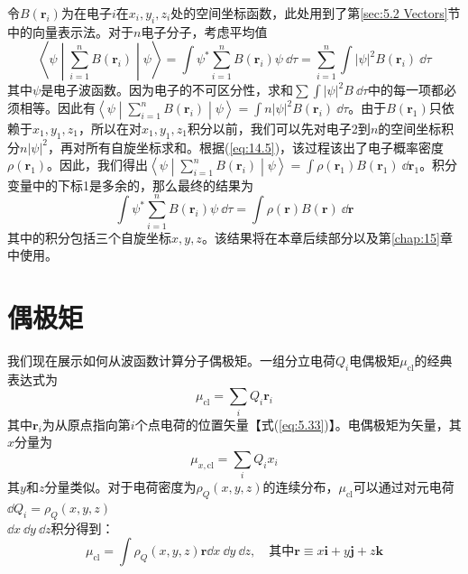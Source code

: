     令$B\left(\mathbf{r}_i\right)$为在电子$i$在$x_i,y_i,z_i$处的空间坐标函数，此处用到了第\ref{sec:5.2 Vectors}节中的向量表示法。对于$n$电子分子，考虑平均值
    \begin{equation*}
        \left\langle \psi \middle| \sum_{i=1}^{n} B\left(\mathbf{r}_i\right) \middle| \psi \right\rangle = \int \psi^* \sum_{i=1}^{n} B\left(\mathbf{r}_i\right) \psi \:\dd \tau = \sum_{i=1}^{n} \int \left|\psi\right|^2 B\left(\mathbf{r}_i\right) \:\dd \tau
    \end{equation*}
    其中$\psi$是电子波函数。因为电子的不可区分性，求和$\sum \int \left|\psi\right|^2B\:\dd \tau$中的每一项都必须相等。因此有$\left\langle \psi \middle| \sum_{i=1}^{n} B\left(\mathbf{r}_i\right) \middle| \psi \right\rangle = \int n \left|\psi\right|^2B\left(\mathbf{r}_i\right)\:\dd \tau$。由于$B\left(\mathbf{r}_1\right)$只依赖于$x_1,y_1,z_1$，所以在对$x_1,y_1,z_1$积分以前，我们可以先对电子2到$n$的空间坐标积分$n\left|\psi\right|^2$，再对所有自旋坐标求和。根据(\ref{eq:14.5})，该过程该出了电子概率密度$\rho\left(\mathbf{r}_1\right)$。因此，我们得出$\left\langle \psi \middle| \sum_{i=1}^{n} B\left(\mathbf{r}_i\right) \middle| \psi \right\rangle = \int \rho\left(\mathbf{r}_1\right) B\left(\mathbf{r}_1\right)\:\dd \mathbf{r}_1$。积分变量中的下标1是多余的，那么最终的结果为
    \begin{equation}
        \int \psi^* \sum_{i=1}^{n} B\left(\mathbf{r}_i\right) \psi \:\dd \tau = \int \rho\left(\mathbf{r}\right) B\left(\mathbf{r}\right)\:\dd \mathbf{r}
        \label{eq:14.8}
    \end{equation}
    其中的积分包括三个自旋坐标$x,y,z$。该结果将在本章后续部分以及第\ref{chap:15}章中使用。

\section{偶极矩}
\label{sec:14.2 Dipole Moments}

    我们现在展示如何从波函数计算分子偶极矩。一组分立电荷$Q_i$电偶极矩$\mu_{\text{cl}}$的经典表达式为
    \begin{equation}
        \mu_{\text{cl}} = \sum_{i} Q_i \mathbf{r}_i
        \label{eq:14.9}
    \end{equation}
    其中$\mathbf{r}_i$为从原点指向第$i$个点电荷的位置矢量【式(\ref{eq:5.33})】。电偶极矩为矢量，其$x$分量为
    \begin{equation}
        \mu_{x,\text{cl}} = \sum_{i} Q_i x_i
        \label{eq:14.10}
    \end{equation}
    其$y$和$z$分量类似。对于电荷密度为$\rho_Q\left(x,y,z\right)$的连续分布，$\mu_{\text{cl}}$可以通过对元电荷$\dd Q_i = \rho_Q\left(x,y,z\right)$\\$\dd x\:\dd y\:\dd z$积分得到：
    \begin{equation}
        \mu_{\text{cl}} = \int \rho_Q\left(x,y,z\right) \mathbf{r} \dd x\:\dd y\:\dd z, \quad \text{其中} \mathbf{r} \equiv x\mathbf{i} + y\mathbf{j} + z\mathbf{k}
        \label{eq:14.11}
    \end{equation}

